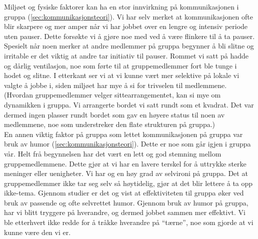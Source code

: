
Miljøet og fysiske faktorer kan ha en stor innvirkning på kommunikasjonen i
gruppa (\ref{sec:kommunikasjonsteori}). Vi har selv
merket at kommunikasjonen ofte blir skarpere og mer amper når vi har jobbet over en lengre og
intensiv periode uten pauser. Dette forsøkte vi å gjøre noe med ved å være flinkere til å ta
pauser. Spesielt når noen merker at andre medlemmer på gruppa begynner å bli slitne og irritable
er det viktig at andre tar initiativ til pauser. Rommet vi satt på hadde og dårlig ventilasjon,
noe som førte til at gruppemedlemmer fort ble tunge i hodet og slitne. I etterkant ser vi at
vi kunne vært mer selektive på lokale vi valgte å jobbe i, siden miljøet har mye å si for 
trivselen til medlemmene. (Hvordan gruppemedlemmer velger sittearrangementet, kan si mye om 
dynamikken i gruppa. Vi arrangerte bordet vi satt rundt som et kvadrat. Det var dermed ingen
plasser rundt bordet som gav en høyere status til noen av medlemmene, noe som understreker den 
flate strukturen på gruppa.)\\

En annen viktig faktor på gruppa som lettet kommunikasjonen på gruppa var bruk
av humor (\ref{sec:kommunikasjonsteori}). Dette er noe
som går igjen i gruppa vår. Helt frå begynnelsen har det vært en lett og god stemning mellom gruppemedlemmene. 
Dette gjør at vi har en lavere terskel for å uttrykke sterke meninger eller uenigheter. Vi har og en høy grad 
av selvironi på gruppa. Det at gruppemedlemmer ikke tar seg selv så høytidelig, gjør at det blir lettere å ta 
opp ikke-tema. Gjennom studier er det og vist at effektiviteten til gruppa øker ved bruk av passende og ofte 
selvrettet humor. Gjennom bruk av humor på gruppa, har vi blitt tryggere på hverandre, og dermed jobbet sammen 
mer effektivt. Vi ble etterhvert ikke redde for å tråkke hverandre på ``tærne'', noe som gjorde at vi kunne være den vi er. 


